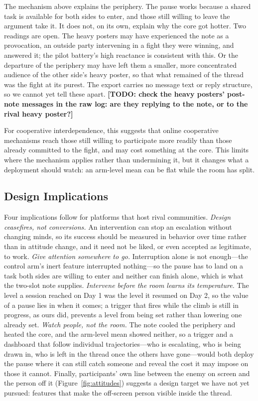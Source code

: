 \documentclass[manuscript,screen,review,anonymous]{acmart}
\newcommand{\todonote}[1]{\textcolor{orange!80!black}{\textbf{[TODO: #1]}}}
\begin{document}
The mechanism above explains the periphery. The pause works because a shared
task is available for both sides to enter, and those still willing to leave
the argument take it. It does not, on its own, explain why the core got
hotter. Two readings are open. The heavy posters may have experienced the
note as a provocation, an outside party intervening in a fight they were
winning, and answered it; the pilot battery's high reactance is consistent
with this. Or the departure of the periphery may have left them a smaller,
more concentrated audience of the other side's heavy poster, so that what
remained of the thread was the fight at its purest. The export carries no
message text or reply structure, so we cannot yet tell these apart.
\todonote{check the heavy posters' post-note messages in the raw log: are
they replying to the note, or to the rival heavy poster?}

For cooperative interdependence, this suggests that online cooperative
mechanisms reach those still willing to participate more readily than those
already committed to the fight, and may cost something at the core. This
limits where the mechanism applies rather than undermining it, but it
changes what a deployment should watch: an arm-level mean can be flat while
the room has split.

\subsection{Design Implications}

Four implications follow for platforms that host rival communities.
\emph{Design ceasefires, not conversions.} An intervention can stop an
escalation without changing minds, so its success should be measured in
behavior over time rather than in attitude change, and it need not be liked,
or even accepted as legitimate, to work. \emph{Give attention somewhere to
go.} Interruption alone is not enough---the control arm's inert feature
interrupted nothing---so the pause has to land on a task both sides are
willing to enter and neither can finish alone, which is what the two-slot
note supplies. \emph{Intervene before the room learns its temperature.} The
level a session reached on Day 1 was the level it resumed on Day 2, so the
value of a pause lies in when it comes; a trigger that fires while the climb
is still in progress, as ours did, prevents a level from being set rather
than lowering one already set. \emph{Watch people, not the room.} The note
cooled the periphery and heated the core, and the arm-level mean showed
neither, so a trigger and a dashboard that follow individual
trajectories---who is escalating, who is being drawn in, who is left in the
thread once the others have gone---would both deploy the pause where it can
still catch someone and reveal the cost it may impose on those it cannot.
Finally, participants' own line between the enemy on screen and the person
off it (Figure~\ref{fig:attitudes}) suggests a design target we have not yet
pursued: features that make the off-screen person visible inside the thread.
\end{document}
